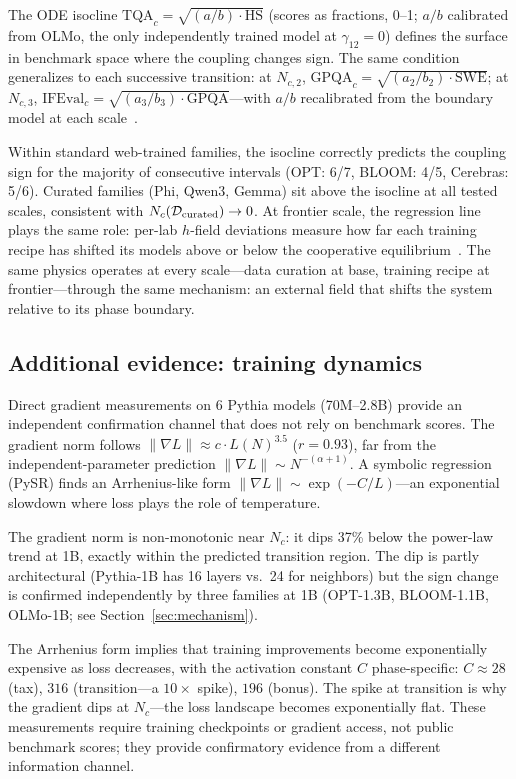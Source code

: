 \documentclass{article}
\begin{document}
The ODE isocline $\mathrm{TQA}_c = \sqrt{(a/b) \cdot \mathrm{HS}}$ (scores as fractions, 0--1;
$a/b$ calibrated from OLMo, the only independently trained model at $\gamma_{12} = 0$)
defines the surface in benchmark space where the coupling changes sign.
The same condition generalizes to each successive transition:
at $N_{c,2}$, $\mathrm{GPQA}_c = \sqrt{(a_2/b_2) \cdot \mathrm{SWE}}$;
at $N_{c,3}$, $\mathrm{IFEval}_c = \sqrt{(a_3/b_3) \cdot \mathrm{GPQA}}$---with
$a/b$ recalibrated from the boundary model at each scale~\cite{amin2026growing}.

Within standard web-trained families, the isocline correctly predicts the coupling sign
for the majority of consecutive intervals (OPT: 6/7, BLOOM: 4/5, Cerebras: 5/6).
Curated families (Phi, Qwen3, Gemma) sit above the isocline at all tested scales,
consistent with $N_c(\mathcal{D}_{\rm curated}) \to 0$.
At frontier scale, the regression line plays the same role:
per-lab $h$-field deviations measure how far each training recipe has shifted
its models above or below the cooperative equilibrium~\cite{amin2026growing}.
The same physics operates at every scale---data curation at base,
training recipe at frontier---through the same mechanism:
an external field that shifts the system relative to its phase boundary.

\subsection{Additional evidence: training dynamics}
\label{app:gradients}

Direct gradient measurements on 6 Pythia models (70M--2.8B) provide
an independent confirmation channel that does not rely on benchmark scores.
The gradient norm follows $\|\nabla L\| \approx c \cdot L(N)^{3.5}$ ($r = 0.93$),
far from the independent-parameter prediction $\|\nabla L\| \sim N^{-(\alpha+1)}$.
A symbolic regression (PySR) finds an Arrhenius-like form
$\|\nabla L\| \sim \exp(-C/L)$---an exponential slowdown
where loss plays the role of temperature.

The gradient norm is non-monotonic near $N_c$:
it dips 37\% below the power-law trend at 1B,
exactly within the predicted transition region.
The dip is partly architectural (Pythia-1B has 16 layers vs.\ 24 for neighbors)
but the sign change is confirmed independently by three families at 1B
(OPT-1.3B, BLOOM-1.1B, OLMo-1B; see Section~\ref{sec:mechanism}).

The Arrhenius form implies that training improvements become exponentially expensive
as loss decreases, with the activation constant $C$ phase-specific:
$C \approx 28$ (tax), $316$ (transition---a $10\times$ spike), $196$ (bonus).
The spike at transition is why the gradient dips at $N_c$---the loss landscape
becomes exponentially flat.
These measurements require training checkpoints or gradient access,
not public benchmark scores; they provide confirmatory evidence
from a different information channel.
\end{document}
